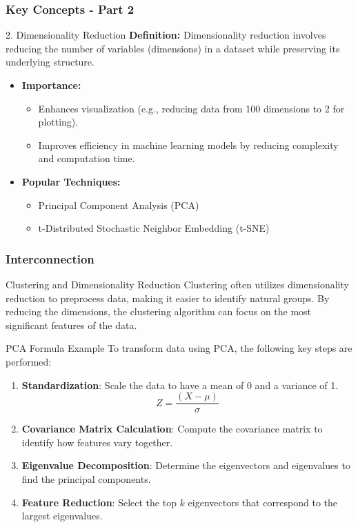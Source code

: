 \documentclass[aspectratio=169]{beamer}
\begin{document}
\begin{frame}[fragile]
    \frametitle{Key Concepts - Part 2}
    \begin{block}{2. Dimensionality Reduction}
        \textbf{Definition:} Dimensionality reduction involves reducing the number of variables (dimensions) in a dataset while preserving its underlying structure.
    \end{block}
    \begin{itemize}
        \item \textbf{Importance:}
        \begin{itemize}
            \item Enhances visualization (e.g., reducing data from 100 dimensions to 2 for plotting).
            \item Improves efficiency in machine learning models by reducing complexity and computation time.
        \end{itemize}
        \item \textbf{Popular Techniques:} 
        \begin{itemize}
            \item Principal Component Analysis (PCA)
            \item t-Distributed Stochastic Neighbor Embedding (t-SNE)
        \end{itemize}
    \end{itemize}
\end{frame}

\begin{frame}[fragile]
    \frametitle{Interconnection}
    \begin{block}{Clustering and Dimensionality Reduction}
        Clustering often utilizes dimensionality reduction to preprocess data, making it easier to identify natural groups. 
        By reducing the dimensions, the clustering algorithm can focus on the most significant features of the data.
    \end{block}
    \begin{block}{PCA Formula Example}
        To transform data using PCA, the following key steps are performed:
    \end{block}
    \begin{enumerate}
        \item \textbf{Standardization}: Scale the data to have a mean of 0 and a variance of 1.
        \begin{equation}
            Z = \frac{(X - \mu)}{\sigma}
        \end{equation}
        \item \textbf{Covariance Matrix Calculation}: Compute the covariance matrix to identify how features vary together.
        \item \textbf{Eigenvalue Decomposition}: Determine the eigenvectors and eigenvalues to find the principal components.
        \item \textbf{Feature Reduction}: Select the top $k$ eigenvectors that correspond to the largest eigenvalues.
    \end{enumerate}
\end{frame}
\end{document}
